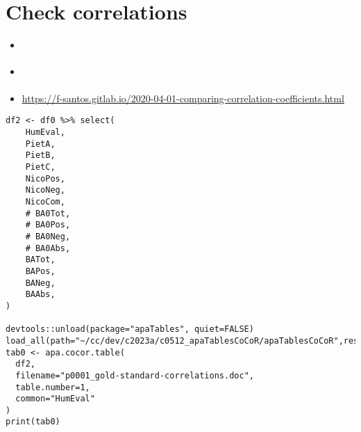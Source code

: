\documentclass[a4paper,10pt,onecolumn,oneside,openright]{article}
\begin{document}
\section{Check correlations}
\label{sec:orgc3a6407}
\begin{itemize}
\item \textcite{DiedenhofenMusch2015a}
\item \textcite{Diedenhofen2022a}
\item \url{https://f-santos.gitlab.io/2020-04-01-comparing-correlation-coefficients.html}
\end{itemize}
\begin{verbatim}
df2 <- df0 %>% select(
    HumEval,
    PietA,
    PietB,
    PietC,
    NicoPos,
    NicoNeg,
    NicoCom,
    # BA0Tot,
    # BA0Pos,
    # BA0Neg,
    # BA0Abs,
    BATot,
    BAPos,
    BANeg,
    BAAbs,
)

devtools::unload(package="apaTables", quiet=FALSE)
load_all(path="~/cc/dev/c2023a/c0512_apaTablesCoCoR/apaTablesCoCoR",reset=TRUE,recompile=TRUE,export_all=TRUE,helpers=TRUE,quiet=FALSE)
tab0 <- apa.cocor.table(
  df2,
  filename="p0001_gold-standard-correlations.doc",
  table.number=1,
  common="HumEval"
)
print(tab0)
\end{verbatim}
\end{document}

